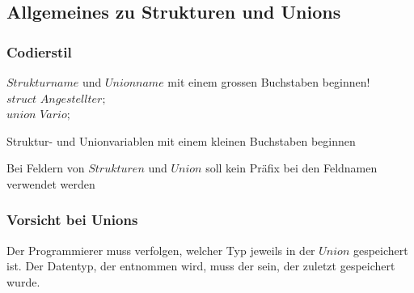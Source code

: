 	\subsection{Allgemeines zu Strukturen und Unions}
		\subsubsection{Codierstil}
			\begin{compactitem}
				\item $Strukturname$ und $Unionname$ mit einem grossen Buchstaben beginnen!\\
				$struct$ $Angestellter;$\\
				$union$ $Vario;$
				\item Struktur- und Unionvariablen mit einem kleinen Buchstaben beginnen
				\item Bei Feldern von $Strukturen$ und $Union$ soll kein Präfix bei den Feldnamen verwendet werden
			\end{compactitem}
		\subsubsection{Vorsicht bei Unions}	
			\begin{compactitem}
				\item Der Programmierer muss verfolgen, welcher Typ jeweils in der $Union$ gespeichert ist. Der Datentyp, der entnommen wird, muss der sein, der zuletzt gespeichert wurde. 
			\end{compactitem}		